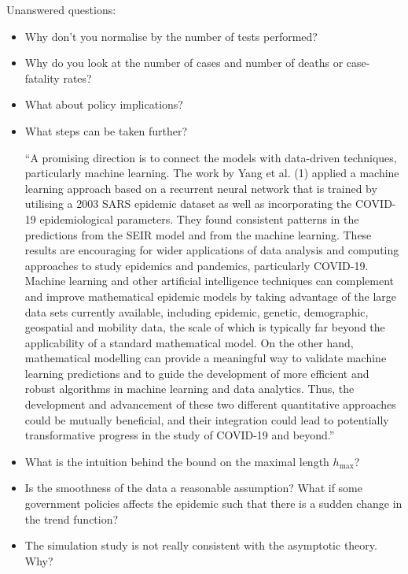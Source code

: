 \documentclass[a4paper,12pt]{article}
\numberwithin{equation}{section}
\begin{document}
Unanswered questions:
\begin{itemize}


\item Why don't you normalise by the number of tests performed?
\item Why do you look at the number of cases and number of deaths or case-fatality rates?
\item What about policy implications?
\item What steps can be taken further?
	
	``A promising direction is to connect the models with data-driven techniques, particularly machine learning. The work by Yang et al. (1) applied a machine learning approach based on a recurrent neural network that is trained by utilising a 2003 SARS epidemic dataset as well as incorporating the COVID-19 epidemiological parameters. They found consistent patterns in the predictions from the SEIR model and from the machine learning. These results are encouraging for wider applications of data analysis and computing approaches to study epidemics and pandemics, particularly COVID-19. Machine learning and other artificial intelligence techniques can complement and improve mathematical epidemic models by taking advantage of the large data sets currently available, including epidemic, genetic, demographic, geospatial and mobility data, the scale of which is typically far beyond the applicability of a standard mathematical model. On the other hand, mathematical modelling can provide a meaningful way to validate machine learning predictions and to guide the development of more efficient and robust algorithms in machine learning and data analytics. Thus, the development and advancement of these two different quantitative approaches could be mutually beneficial, and their integration could lead to potentially transformative progress in the study of COVID-19 and beyond.''

\item What is the intuition behind the bound on the maximal length $h_{\text{max}}$?
\item Is the smoothness of the data a reasonable assumption? What if some government policies affects the epidemic such that there is a sudden change in the trend function?
\item The simulation study is not really consistent with the asymptotic theory. Why?
\end{itemize}
\end{document}
